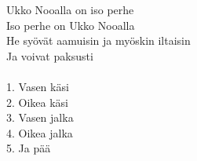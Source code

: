
Ukko Nooalla on iso perhe \\
Iso perhe on Ukko Nooalla \\
He syövät aamuisin ja myöskin iltaisin \\
Ja voivat paksusti \\
\hspace{10mm} \\
1. Vasen käsi \\
2. Oikea käsi \\
3. Vasen jalka \\
4. Oikea jalka \\
5. Ja pää \\